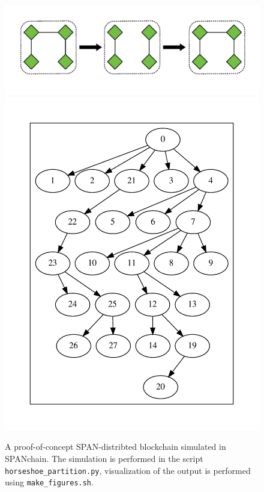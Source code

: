 \begin{figure}
	\centering
	\includegraphics[width=\columnwidth]{horseshoe.pdf}
	\includegraphics[width=\columnwidth]{horseshoe_0.pdf}
	\caption{A proof-of-concept SPAN-distribted blockchain simulated in SPANchain.
		The simulation is performed in the script \texttt{horseshoe\_partition.py},
		visualization of the output is performed using \texttt{make\_figures.sh}.}
	\label{fig:old_town_road}
\end{figure}
